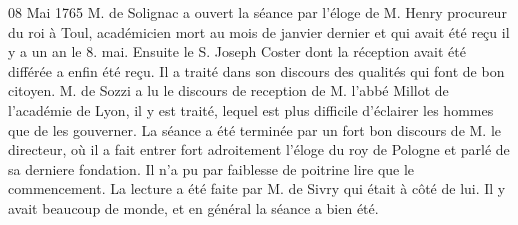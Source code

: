 \begin{diary}{08 Mai 1765}{}
                           M. de Solignac a ouvert la séance
                           par
                           l'éloge de M. Henry
                           procureur du roi à Toul,
                           académicien mort au mois de janvier dernier
                           et qui avait été reçu il y a un an le 8.
                              mai.
                           Ensuite le S. Joseph Coster dont
                           la réception
                           avait été différée a enfin été reçu. Il a
                           traité dans son discours des
                           qualités qui font
                           de bon citoyen. M. de Sozzi a
                           lu le discours
                              de reception de M. l'abbé
                                 Millot de l'académie
                              de Lyon, il y est traité, lequel est plus difficile
                           d'éclairer les hommes que de les gouverner.
                           La séance a été terminée par un fort
                           bon discours de M. le
                              directeur, où il a fait entrer fort
                           adroitement l'éloge du roy de Pologne
                           et parlé de sa derniere fondation. Il n'a
                           pu par faiblesse de poitrine lire que le commencement.
                           La lecture a été faite par M. de
                              Sivry qui
                           était à côté de lui. Il y avait beaucoup de
                           monde, et en général la séance a bien été. \bigskip
        

\end{diary}
